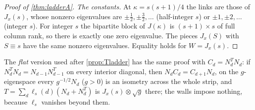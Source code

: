 \begin{proof}[Proof of \cref{thm:ladderA}]
\emph{The constants.} At $\kappa=s(s+1)/4$ the links are those of $J_x(s)$, whose nonzero
eigenvalues are $\pm\frac12,\pm\frac32,\dots$ (half-integer $s$) or $\pm1,\pm2,\dots$ (integer $s$).
For integer $s$ the bipartite block of $J(\kappa)$ is $(s+1)\times s$ of full column rank, so
there is exactly one zero eigenvalue. The pieces $J_x(S)$ with $S\equiv s$ have the same
nonzero eigenvalues. Equality holds for $W=J_x(s)$.
\end{proof}

The \emph{flat} version used after \cref{prop:Tladder} has the same proof with
$C_d=N_d^TN_d$: if $N_d^TN_d=N_{d-1}N_{d-1}^T$ on every interior diagonal, then $N_dC_d=C_{d+1}N_d$,
on the $g$-eigenspace every $g^{-1/2}N_d$ ($g>0$) is an isometry across the whole strip, and
$T=\sum_d\ell_s(d)(N_d+N_d^T)$ is $J_x(s)\otimes\sqrt g$ there; the walls impose nothing,
because $\ell_s$ vanishes beyond them.
